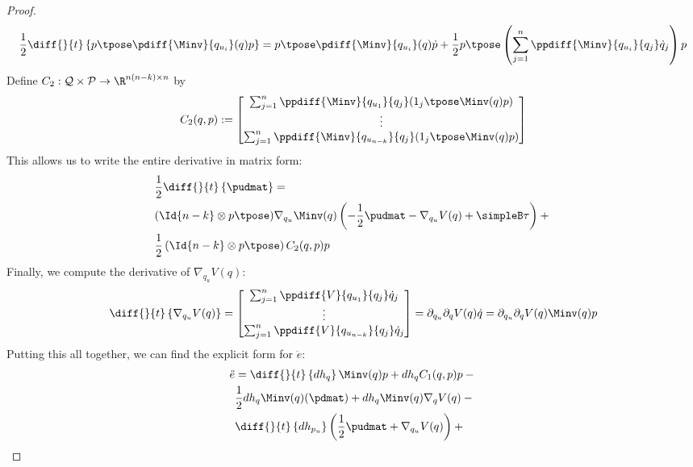 \begin{proof}
\begin{align*}
        \frac{1}{2} \diff{}{t}\left\{p\tpose \pdiff{\Minv}{q_{u_i}}(q)p\right\}
        = p\tpose \pdiff{\Minv}{q_{u_i}}(q) \dot{p} + 
        \frac{1}{2} p\tpose \left( \sum_{j=1}^n \ppdiff{\Minv}{q_{u_i}}{q_j}
        \dot{q}_j \right) p
    \end{align*}
    Define \(C_2 : \mathcal{Q} \times \mathcal{P} \rightarrow \R^{n(n-k)\times n}\) 
    by
    \[
        C_2(q,p) := \begin{bmatrix}
            \sum_{j=1}^n \ppdiff{\Minv}{q_{u_1}}{q_j} (1_j\tpose \Minv(q)p) \\
            \vdots \\
            \sum_{j=1}^n \ppdiff{\Minv}{q_{u_{n-k}}}{q_j} (1_j\tpose \Minv(q)p) \\
        \end{bmatrix}
    \]
    This allows us to write the entire derivative in matrix form:
    \begin{align*}
        & \frac{1}{2} \diff{}{t} \left\{ \pudmat \right\} ={} \\
        & (\Id{n-k} \otimes p\tpose)\nabla_{q_u}\Minv(q)
        \left(-\frac{1}{2}\pudmat - \nabla_{q_u}V(q) + \simpleB \tau \right) +{}
        \\
        & \frac{1}{2}\left(\Id{n-k}\otimes p\tpose\right) C_2(q,p) p
    \end{align*}
    Finally, we compute the derivative of \(\nabla_{q_u}V(q)\):
    \begin{align*}
        \diff{}{t}\left\{\nabla_{q_u}V(q)\right\} = 
        \begin{bmatrix}
            \sum_{j=1}^n \ppdiff{V}{q_{u_1}}{q_j}\dot{q}_j \\
            \vdots \\
            \sum_{j=1}^n \ppdiff{V}{q_{u_{n-k}}}{q_j}\dot{q}_j
        \end{bmatrix} = \partial_{q_u} \partial_q V(q) \dot{q} 
        = \partial_{q_u} \partial_q V(q) \Minv(q)p
    \end{align*}
    Putting this all together, we can find the explicit form for \(\ddot{e}\):
    \begin{align*}
        \ddot{e} &= \diff{}{t}\left\{dh_q\right\}\Minv(q)p + dh_q C_1(q,p)p -{}\\
     & \frac{1}{2}dh_q\Minv(q)(\pdmat) + 
        dh_q\Minv(q)\nabla_qV(q) -{}\\
     & \diff{}{t}\left\{dh_{p_u}\right\}
     \left(\frac{1}{2}\pudmat + \nabla_{q_u}V(q)\right) +{} \\

\end{align*}
\end{proof}
